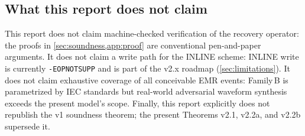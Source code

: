 \subsection{What this report does not claim}

This report does not claim machine-checked verification of the
recovery operator: the proofs in
\cref{sec:soundness,app:proof} are conventional pen-and-paper
arguments. It does not claim a write path for the INLINE scheme:
INLINE write is currently \texttt{-EOPNOTSUPP} and is part of the
v2.x roadmap (\cref{sec:limitations}). It does not claim
exhaustive coverage of all conceivable EMR events: Family\,B is
parametrized by IEC standards but real-world adversarial waveform
synthesis exceeds the present model's scope. Finally, this report
explicitly does not republish the v1 soundness theorem; the
present Theorems v2.1, v2.2a, and v2.2b supersede it.
